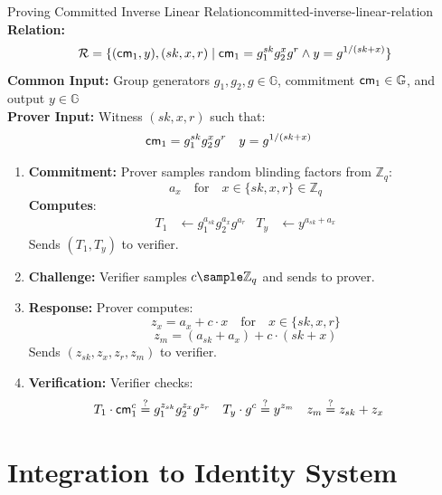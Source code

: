 \begin{protocol}{Proving Committed Inverse Linear Relation}{committed-inverse-linear-relation}\label{pok-committed-inverse-linear-relation}
\textbf{Relation: }
\[
\mathcal{R} = \{(\mathsf{cm}_1, y), (sk, x, r) \mid \mathsf{cm}_1 = g_1^{sk} g_2^{x} g^{r} \wedge y = g^{1/(sk + x)}\}
\]
\textbf{Common Input:} Group generators $g_1, g_2, g \in \mathbb{G}$, commitment $\mathsf{cm}_1 \in \mathbb{G}$, and output $y \in \mathbb{G}$\\
\textbf{Prover Input:} Witness $(sk, x, r)$ such that:
    \begin{align*}
        \mathsf{cm}_1 &= g_1^{sk} g_2^{x} g^{r} & y &= g^{1/(sk + x)}
    \end{align*}
\begin{enumerate}
    \item \textbf{Commitment:} Prover samples random blinding factors from $\mathbb{Z}_q$:
       \[
        a_x \quad \text{for} \quad x \in \{ sk, x, r \} \in \mathbb{Z}_q
       \]
    \textbf{Computes}:
    \begin{align*}
        T_1 &\gets g_1^{a_{sk}} g_2^{a_x} g^{a_r} & T_y &\gets y^{a_{sk} + a_x}
    \end{align*}
    Sends $(T_1, T_y)$ to verifier.
    
    \item \textbf{Challenge:} Verifier samples $c \sample \mathbb{Z}_q$ and sends to prover.
    
    \item \textbf{Response:} Prover computes:
    \[
    z_x = a_x + c \cdot x \quad \text{for} \quad x \in \{ sk, x, r \}
    \]
    \[
    z_m = (a_{sk} + a_x) + c \cdot (sk + x)
    \]
    Sends $(z_{sk}, z_x, z_r, z_m)$ to verifier.
    
    \item \textbf{Verification:} Verifier checks:
    \begin{align*}
        T_1 \cdot \mathsf{cm}_1^c &\stackrel{?}{=} g_1^{z_{sk}} g_2^{z_x} g^{z_r} &
        T_y \cdot g^c &\stackrel{?}{=} y^{z_m} &
        z_m &\stackrel{?}{=} z_{sk} + z_x
    \end{align*}
\end{enumerate}
\end{protocol}









\newpage
\section{Integration to Identity System}

